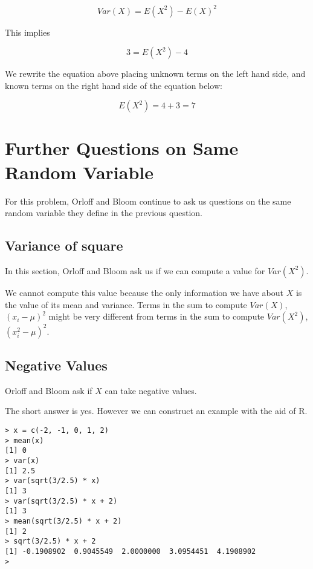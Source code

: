 \documentclass[a4paper,11pt]{article}
\begin{document}
\begin{equation}
	Var \left( X \right) = E \left( X^{2} \right) - E \left( X\right)^{2}
\end{equation}

This implies

\begin{equation}
	3 = E \left( X^{2} \right) - 4
\end{equation}

We rewrite the equation above placing unknown terms on the left hand side,
and known terms on the right hand side of the equation below:

\begin{equation}
	E \left( X^{2} \right) =  4 + 3 = 7
\end{equation}

\section{Further Questions on Same Random Variable}
For this problem, Orloff and Bloom continue to ask us questions on the same
random variable they define in the previous question.

\subsection{Variance of square}
In this section, Orloff and Bloom ask us if we can compute a value for
$Var \left( X^{2} \right)$.

We cannot compute this value because the only information we have about $X$ is
the value of its mean and variance. Terms in the sum to compute
$Var \left( X \right)$,  $ \left( x_{i} - \mu \right)^{2}$
might be very different from terms in the sum to compute
$Var \left( X^{2} \right)$, $\left( x_{i}^{2} - \mu \right)^{2}$.

\subsection{Negative Values}
Orloff and Bloom ask if $X$ can take negative values.

The short answer is yes.  However we can construct an example with the aid
of R.

\begin{lstlisting}
> x = c(-2, -1, 0, 1, 2)
> mean(x)
[1] 0
> var(x)
[1] 2.5
> var(sqrt(3/2.5) * x)
[1] 3
> var(sqrt(3/2.5) * x + 2)
[1] 3
> mean(sqrt(3/2.5) * x + 2)
[1] 2
> sqrt(3/2.5) * x + 2
[1] -0.1908902  0.9045549  2.0000000  3.0954451  4.1908902
>
\end{lstlisting}
\end{document}
